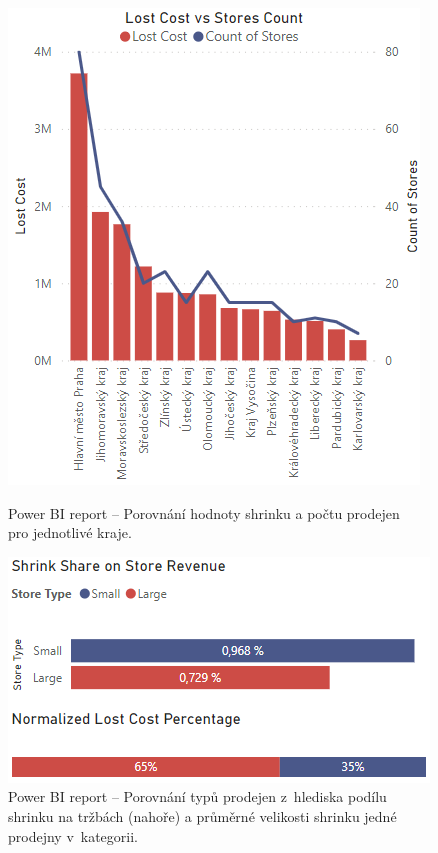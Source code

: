 \begin{figure}[hbtp!]
    \centering
    \begin{minipage}{.45\textwidth}
        \centering
        \captionsetup{justification=centering}
        \includegraphics[width=\textwidth]{obrazky/PBI/vsLoc.png}
        \caption{Power BI report -- Porovnání hodnoty shrinku a počtu prodejen \\pro jednotlivé kraje.}
        \label{obr:PBI:locvs}
    \end{minipage}%
    \begin{minipage}{.55\textwidth}
        \centering
        \captionsetup{justification=centering}
        \includegraphics[width=\textwidth]{obrazky/PBI/normTypes.png}
        \caption{Power BI report -- Porovnání typů prodejen z~hlediska podílu shrinku na tržbách (nahoře) a průměrné velikosti shrinku jedné prodejny v~kategorii.}
        \label{obr:PBI:types}
    \end{minipage}
\end{figure}

